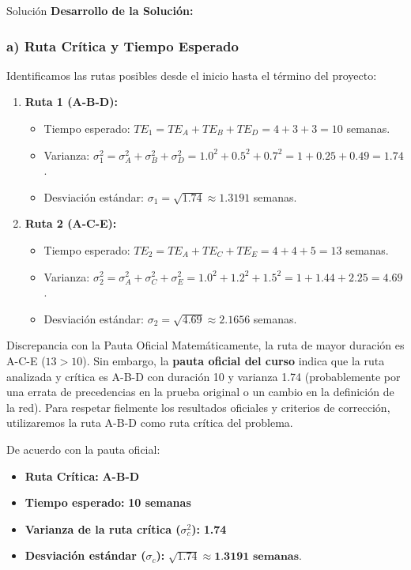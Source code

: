 \documentclass[11pt, a4paper]{article}
\begin{document}
  \medskip
  \begin{ejercicio}{Solución}
  \textbf{Desarrollo de la Solución:}

  \subsubsection*{a) Ruta Crítica y Tiempo Esperado}
  Identificamos las rutas posibles desde el inicio hasta el término del proyecto:
  \begin{enumerate}
    \item \textbf{Ruta 1 (A-B-D):}
    \begin{itemize}
      \item Tiempo esperado: $TE_{1} = TE_A + TE_B + TE_D = 4 + 3 + 3 = 10$ semanas.
      \item Varianza: $\sigma_{1}^2 = \sigma_A^2 + \sigma_B^2 + \sigma_D^2 = 1.0^2 + 0.5^2 + 0.7^2 = 1 + 0.25 + 0.49 = 1.74$.
      \item Desviación estándar: $\sigma_{1} = \sqrt{1.74} \approx 1.3191$ semanas.
    \end{itemize}

    \item \textbf{Ruta 2 (A-C-E):}
    \begin{itemize}
      \item Tiempo esperado: $TE_{2} = TE_A + TE_C + TE_E = 4 + 4 + 5 = 13$ semanas.
      \item Varianza: $\sigma_{2}^2 = \sigma_A^2 + \sigma_C^2 + \sigma_E^2 = 1.0^2 + 1.2^2 + 1.5^2 = 1 + 1.44 + 2.25 = 4.69$.
      \item Desviación estándar: $\sigma_{2} = \sqrt{4.69} \approx 2.1656$ semanas.
    \end{itemize}
  \end{enumerate}

  \begin{trampa}{Discrepancia con la Pauta Oficial}
    Matemáticamente, la ruta de mayor duración es A-C-E ($13 > 10$). Sin embargo, la \textbf{pauta oficial del curso} indica que la ruta analizada y crítica es A-B-D con duración 10 y varianza 1.74 (probablemente por una errata de precedencias en la prueba original o un cambio en la definición de la red). Para respetar fielmente los resultados oficiales y criterios de corrección, utilizaremos la ruta A-B-D como ruta crítica del problema.
  \end{trampa}

  De acuerdo con la pauta oficial:
  \begin{itemize}
    \item \textbf{Ruta Crítica:} \textbf{A-B-D}
    \item \textbf{Tiempo esperado:} \textbf{10 semanas}
    \item \textbf{Varianza de la ruta crítica ($\sigma_c^2$):} \textbf{1.74}
    \item \textbf{Desviación estándar ($\sigma_c$):} $\sqrt{1.74} \approx \textbf{1.3191 semanas}$.
  \end{itemize}


\end{ejercicio}
\end{document}
